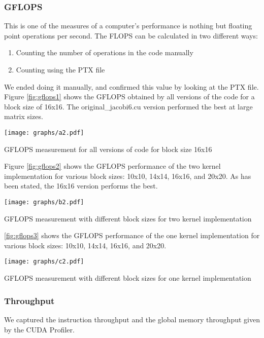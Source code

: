 \documentclass[10pt]{article}
\makeatletter
\newenvironment{figurehere}
{\def\@captype{figure}}
{}
\makeatother
\begin{document}
\begin{multicols}{2}
  \subsubsection{GFLOPS}
  This is one of the measures of a computer's performance is nothing but floating point operations per second.
  The FLOPS can be calculated in two different ways:
  \begin{enumerate}
    \item Counting the number of operations in the code manually
    \item Counting using the PTX file
  \end{enumerate}
  We ended doing it manually, and confirmed this value by looking at the PTX file.
  Figure \ref{fig:gflops1} shows the GFLOPS obtained by all versions of the code for a block size of 16x16.
  The original\_jacobi6.cu version performed the best at large matrix sizes.

  \begin{figurehere}
    \centering
    \texttt{[image: graphs/a2.pdf]}
    \caption{GFLOPS measurement for all versions of code for block size 16x16}
    \label{fig:gflops1}
  \end{figurehere}

  Figure \ref{fig:gflops2} shows the GFLOPS performance of the two kernel implementation for various block sizes: 10x10, 14x14, 16x16, and 20x20.
  As has been stated, the 16x16 version performs the best.

  \begin{figurehere}
    \centering
    \texttt{[image: graphs/b2.pdf]}
    \caption{GFLOPS measurement with different block sizes for two kernel implementation}
    \label{fig:gflops2}
  \end{figurehere}

  \ref{fig:gflops3} shows the GFLOPS performance of the one kernel implementation for various block sizes: 10x10, 14x14, 16x16, and 20x20.

  \begin{figurehere}
    \centering
    \texttt{[image: graphs/c2.pdf]}
    \caption{GFLOPS measurement with different block sizes for one kernel implementation}
    \label{fig:gflops3}
  \end{figurehere}

  \subsubsection{Throughput}
  We captured the instruction throughput and the global memory throughput given by the CUDA Profiler.


\end{multicols}
\end{document}
